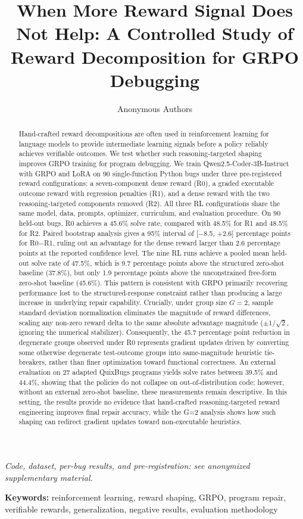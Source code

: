 \documentclass{article}
\title{When More Reward Signal Does Not Help: A Controlled Study of Reward Decomposition for GRPO Debugging}
\author{Anonymous Authors}
\begin{document}
\maketitle

\begin{center}
\textit{Code, dataset, per-bug results, and pre-registration: see anonymized supplementary material.}
\end{center}

\vspace{0.3cm}
\noindent \textbf{Keywords:} reinforcement learning, reward shaping, GRPO, program repair, verifiable rewards, generalization, negative results, evaluation methodology
\vspace{0.3cm}

\begin{abstract}
Hand-crafted reward decompositions are often used in reinforcement learning for language models to provide intermediate learning signals before a policy reliably achieves verifiable outcomes. We test whether such reasoning-targeted shaping improves GRPO training for program debugging. We train Qwen2.5-Coder-3B-Instruct with GRPO and LoRA on 90 single-function Python bugs under three pre-registered reward configurations: a seven-component dense reward (R0), a graded executable outcome reward with regression penalties (R1), and a dense reward with the two reasoning-targeted components removed (R2). All three RL configurations share the same model, data, prompts, optimizer, curriculum, and evaluation procedure. On 90 held-out bugs, R0 achieves a 45.6\% solve rate, compared with 48.5\% for R1 and 48.5\% for R2. Paired bootstrap analysis gives a 95\% interval of [$-$8.5, $+$2.6] percentage points for R0$-$R1, ruling out an advantage for the dense reward larger than 2.6 percentage points at the reported confidence level. The nine RL runs achieve a pooled mean held-out solve rate of 47.5\%, which is 9.7 percentage points above the structured zero-shot baseline (37.8\%), but only 1.9 percentage points above the unconstrained free-form zero-shot baseline (45.6\%). This pattern is consistent with GRPO primarily recovering performance lost to the structured-response constraint rather than producing a large increase in underlying repair capability. Crucially, under group size $G=2$, sample standard deviation normalization eliminates the magnitude of reward differences, scaling any non-zero reward delta to the same absolute advantage magnitude ($\pm 1/\sqrt{2}$, ignoring the numerical stabilizer). Consequently, the 45.7 percentage point reduction in degenerate groups observed under R0 represents gradient updates driven by converting some otherwise degenerate test-outcome groups into same-magnitude heuristic tie-breakers, rather than finer optimization toward functional correctness. An external evaluation on 27 adapted QuixBugs programs yields solve rates between 39.5\% and 44.4\%, showing that the policies do not collapse on out-of-distribution code; however, without an external zero-shot baseline, these measurements remain descriptive. In this setting, the results provide no evidence that hand-crafted reasoning-targeted reward engineering improves final repair accuracy, while the G=2 analysis shows how such shaping can redirect gradient updates toward non-executable heuristics.

\end{abstract}
\end{document}
